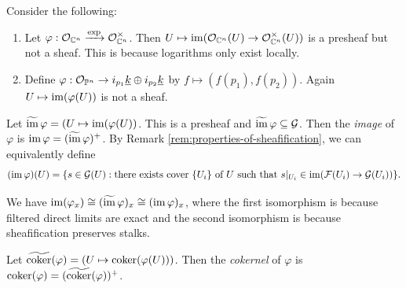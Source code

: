 \begin{example}
  Consider the following:
  \begin{enumerate}
    \item Let $\varphi : \mathcal{O}_{\mathbb{C}^n} \xrightarrow{\exp} \mathcal{O}_{\mathbb{C}^n}^\times$.
      Then $U \mapsto \operatorname{im}(\mathcal{O}_{\mathbb{C}^n}(U) \to \mathcal{O}_{\mathbb{C}^n}^\times(U))$
      is a presheaf but not a sheaf.
      This is because logarithms
      only exist locally.
    \item Define
      $\varphi : \mathcal{O}_{\mathbb{P}^n} \to i_{p_1} \underline{k} \oplus i_{p_2} \underline{k}$
      by $f \mapsto (f(p_1), f(p_2))$.
      Again
      $U \mapsto \operatorname{im}(\varphi(U))$
      is not a sheaf.
  \end{enumerate}
\end{example}

\begin{definition}
  Let $\widetilde{\operatorname{im}}\, \varphi = (U \mapsto \operatorname{im}(\varphi(U))$.
  This is a presheaf and
  $\widetilde{\operatorname{im}}\, \varphi \subseteq \mathcal{G}$.
  Then the \emph{image} of $\varphi$
  is $\operatorname{im} \varphi = (\widetilde{\operatorname{im}}\, \varphi)^+$.
  By Remark \ref{rem:properties-of-sheafification},
  we can equivalently define
  \[
    (\operatorname{im} \varphi)(U)
    = \{
      s \in \mathcal{G}(U)
      : \text{there exists cover }
      \{U_i\} \text{ of } U
      \text{ such that }
      s|_{U_i} \in \operatorname{im}(\mathcal{F}(U_i) \to \mathcal{G}(U_i))
    \}.
  \]
\end{definition}

\begin{remark}
  We have $\operatorname{im}(\varphi_x) \cong (\widetilde{\operatorname{im}}\, \varphi)_x \cong (\operatorname{im} \varphi)_x$,
  where the first isomorphism
  is because filtered direct limits
  are exact and the second isomorphism
  is because sheafification
  preserves stalks.
\end{remark}

\begin{definition}
  Let $\widetilde{\operatorname{coker}}(\varphi) = (U \mapsto \operatorname{coker}(\varphi(U)))$.
  Then the \emph{cokernel} of
  $\varphi$ is $\operatorname{coker}(\varphi) = (\widetilde{\operatorname{coker}}(\varphi))^+$.
\end{definition}

